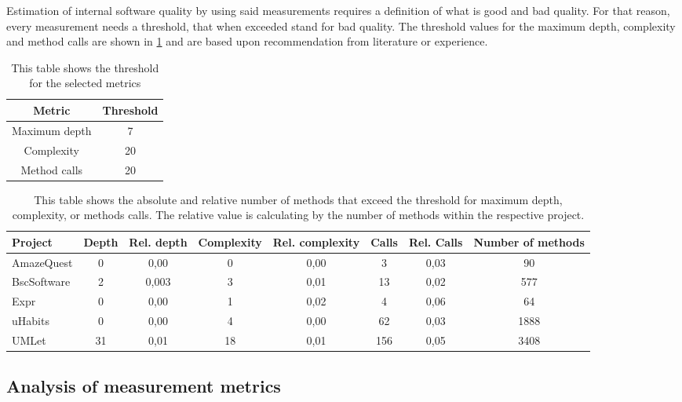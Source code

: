 \documentclass[conference]{IEEEtran}
\begin{document}
Estimation of internal software quality by using said measurements requires a definition of what is good and bad quality. For that reason, every measurement needs a threshold, that when exceeded stand for bad quality. The threshold values for the maximum depth, complexity and method calls are shown in \cref{tbl:thresholds} and are based upon recommendation from literature or experience.
\begin{table}
\centering
    \begin{tabular}{c c}
         Metric         & Threshold    \\ \hline
         Maximum depth  & 7             \\
         Complexity     & 20            \\
         Method calls   & 20            \\
    \end{tabular}
    \caption{This table shows the threshold for the selected metrics}
    \label{tbl:thresholds}
\end{table}

\begin{table}
\centering
\begin{tabular}{l|c c c c c c c}
	Project     & Depth & Rel. depth & Complexity & Rel. complexity & Calls & Rel. Calls & Number of methods \\ \hline
	AmazeQuest  &   0   & 0,00       & 0          & 0,00            & 3     & 0,03       & 90                \\
	BscSoftware &   2   & 0,003      & 3          & 0,01            & 13    & 0,02       & 577               \\
	Expr        &   0   & 0,00       & 1          & 0,02            & 4     & 0,06       & 64                \\
	uHabits     &   0   & 0,00       & 4          & 0,00            & 62    & 0,03       & 1888              \\
	UMLet       &  31   & 0,01       & 18         & 0,01            & 156   & 0,05       & 3408
\end{tabular} 
\caption{This table shows the absolute and relative number of methods that exceed the threshold for maximum depth, complexity, or methods calls. The relative value is calculating by the number of methods within the respective project.}
\label{tbl:exceed}
\end{table}

\subsection{Analysis of measurement metrics}
\end{document}
